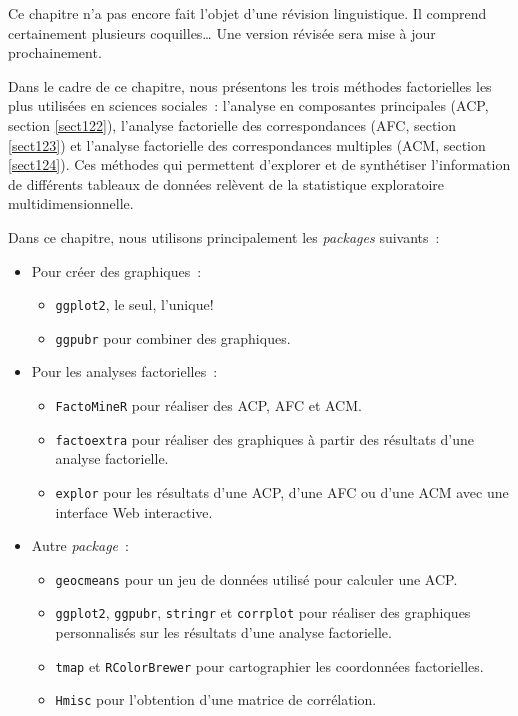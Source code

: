 \documentclass[
  11pt,
  french,
]{book}
\makeatletter
\providecommand{\tightlist}{%
  \setlength{\itemsep}{0pt}\setlength{\parskip}{0pt}}
\newenvironment{kframev}{%
\medskip{}
\setlength{\fboxsep}{.8em}
 \def\at@end@of@kframev{}%
 \ifinner\ifhmode%
  \def\at@end@of@kframev{\end{minipage}}%
  \begin{minipage}{\columnwidth}%
 \fi\fi%
 \def\FrameCommand##1{\hskip\@totalleftmargin \hskip-\fboxsep
 \colorbox{shadebluecolor}{##1}\hskip-\fboxsep
     \hskip-\linewidth \hskip-\@totalleftmargin \hskip\columnwidth}%
 \MakeFramed {\advance\hsize-\width
   \@totalleftmargin\z@ \linewidth\hsize
   \@setminipage}}%
 {\par\unskip\endMakeFramed%
 \at@end@of@kframev}
\newenvironment{rmdblock}[1]
  {
  \begin{itemize}
  \renewcommand{\labelitemi}{
    \raisebox{-.7\height}[0pt][0pt]{
      {\setkeys{Gin}{width=3em,keepaspectratio}\texttt{[image: images/\#1]}}
    }
  }
  \setlength{\fboxsep}{1em}
  \begin{kframev}
  \small
  \item
  }
  {
  \end{kframev}
  \end{itemize}
  }
\newenvironment{bloc_attention}
  {\begin{rmdblock}{attention}}
  {\end{rmdblock}}
\newenvironment{bloc_package}
  {\begin{rmdblock}{package}}
  {\end{rmdblock}}
\makeatother
\begin{document}
\begin{bloc_attention}
Ce chapitre n'a pas encore fait l'objet d'une révision linguistique. Il comprend certainement plusieurs coquilles\ldots{} Une version révisée sera mise à jour prochainement.

\end{bloc_attention}

Dans le cadre de ce chapitre, nous présentons les trois méthodes factorielles les plus utilisées en sciences sociales~: l'analyse en composantes principales (ACP, section \ref{sect122}), l'analyse factorielle des correspondances (AFC, section \ref{sect123}) et l'analyse factorielle des correspondances multiples (ACM, section \ref{sect124}). Ces méthodes qui permettent d'explorer et de synthétiser l'information de différents tableaux de données relèvent de la statistique exploratoire multidimensionnelle.

\begin{bloc_package}

Dans ce chapitre, nous utilisons principalement les \emph{packages} suivants~:

\begin{itemize}
\tightlist
\item
  Pour créer des graphiques~:

  \begin{itemize}
  \tightlist
  \item
    \texttt{ggplot2}, le seul, l'unique!
  \item
    \texttt{ggpubr} pour combiner des graphiques.
  \end{itemize}
\item
  Pour les analyses factorielles~:

  \begin{itemize}
  \tightlist
  \item
    \texttt{FactoMineR} pour réaliser des ACP, AFC et ACM.
  \item
    \texttt{factoextra} pour réaliser des graphiques à partir des résultats d'une analyse factorielle.
  \item
    \texttt{explor} pour les résultats d'une ACP, d'une AFC ou d'une ACM avec une interface Web interactive.
  \end{itemize}
\item
  Autre \emph{package}~:

  \begin{itemize}
  \tightlist
  \item
    \texttt{geocmeans} pour un jeu de données utilisé pour calculer une ACP.
  \item
    \texttt{ggplot2}, \texttt{ggpubr}, \texttt{stringr} et \texttt{corrplot} pour réaliser des graphiques personnalisés sur les résultats d'une analyse factorielle.
  \item
    \texttt{tmap} et \texttt{RColorBrewer} pour cartographier les coordonnées factorielles.
  \item
    \texttt{Hmisc} pour l'obtention d'une matrice de corrélation.
  \end{itemize}
\end{itemize}


\end{bloc_package}
\end{document}
